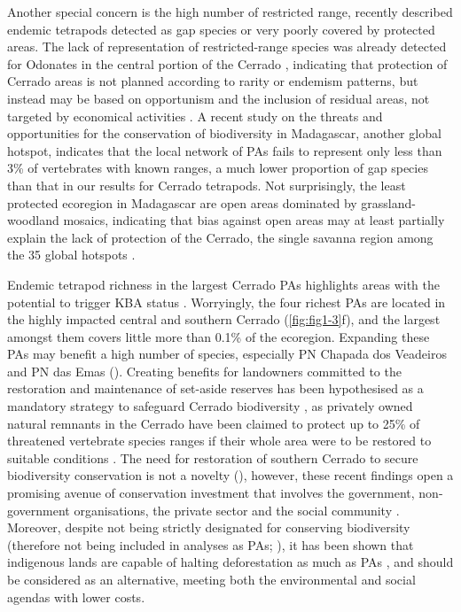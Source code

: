 \documentclass[12pt,openright,oneside,a4paper,english]{abntex2}
\begin{document}
Another special concern is the high number of restricted range, recently described endemic tetrapods detected as gap species or very poorly covered by protected areas. The lack of representation of restricted-range species was already detected for Odonates in the central portion of the Cerrado \citep{NobregaDeMarco2011}, indicating that protection of Cerrado areas is not planned according to rarity or endemism patterns, but instead may be based on opportunism and the inclusion of residual areas, not targeted by economical activities \citep{Margules2000}. A recent study on the threats and opportunities for the conservation of biodiversity in Madagascar, another global hotspot, indicates that the local network of PAs fails to represent only less than 3\% of vertebrates with known ranges, a much lower proportion of gap species than that in our results for Cerrado tetrapods. Not surprisingly, the least protected ecoregion in Madagascar are open areas dominated by grassland-woodland mosaics, indicating that bias against open areas may at least partially explain the lack of protection of the Cerrado, the single savanna region among the 35 global hotspots \citep{ZachosHabel2011}.

Endemic tetrapod richness in the largest Cerrado PAs highlights areas with the potential to trigger KBA status \citep{KBAs2022}. Worryingly, the four richest PAs are located in the highly impacted central and southern Cerrado (\autoref{fig:fig1-3}f), and the largest amongst them covers little more than 0.1\% of the ecoregion. Expanding these PAs may benefit a high number of species, especially PN Chapada dos Veadeiros and PN das Emas (\citealp[see][]{VieiraAlencar2023}). Creating benefits for landowners committed to the restoration and maintenance of set-aside reserves has been hypothesised as a mandatory strategy to safeguard Cerrado biodiversity \citep{Machado2023}, as privately owned natural remnants in the Cerrado have been claimed to protect up to 25\% of threatened vertebrate species ranges if their whole area were to be restored to suitable conditions \citep{deMarcoJr2023}. The need for restoration of southern Cerrado to secure biodiversity conservation is not a novelty (\citealp[see][]{Strassburg2017, VieiraAlencar2023}), however, these recent findings \citep{deMarcoJr2023} open a promising avenue of conservation investment that involves the government, non-government organisations, the private sector and the social community \citep{Machado2023}. Moreover, despite not being strictly designated for conserving biodiversity (therefore not being included in analyses as PAs; \citealp{Locke2005}), it has been shown that indigenous lands are capable of halting deforestation as much as PAs \citep{Sze2022}, and should be considered as an alternative, meeting both the environmental and social agendas with lower costs.
\end{document}
